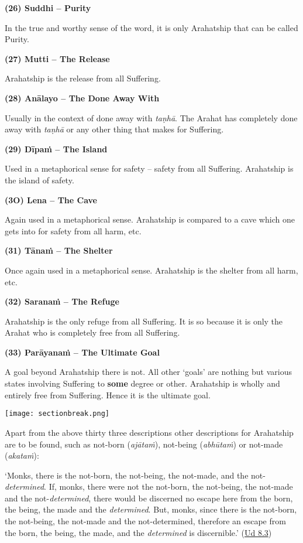 \textbf{(26) Suddhi -- Purity}

\protect\hypertarget{suddhi}{}{}In the true and worthy sense of the word, it is only Arahatship that can be called Purity.

\textbf{(27) Mutti -- The Release}

Arahatship is the release from all Suffering.

\textbf{(28) Anālayo -- The Done Away With}

Usually in the context of done away with \emph{taṇhā}. The Arahat has completely done away with \emph{taṇhā} or any other thing that makes for Suffering.

\textbf{(29) Dīpaṁ -- The Island}

Used in a metaphorical sense for safety -- safety from all Suffering. Arahatship is the island of safety.

\textbf{(3O) Lena -- The Cave}

Again used in a metaphorical sense. Arahatship is compared to a cave which one gets into for safety from all harm, etc.

\textbf{(31) Tānaṁ -- The Shelter}

Once again used in a metaphorical sense. Arahatship is the shelter from all harm, etc.

\textbf{(32) Saranaṁ -- The Refuge}

Arahatship is the only refuge from all Suffering. It is so because it is only the Arahat who is completely free from all Suffering.

\textbf{(33) Parāyanaṁ -- The Ultimate Goal}

A goal beyond Arahatship there is not. All other `goals' are nothing but various states involving Suffering to \textbf{some} degree or other. Arahatship is wholly and entirely free from Suffering. Hence it is the ultimate goal.

\texttt{[image: sectionbreak.png]}

Apart from the above thirty three descriptions other descriptions for Arahatship are to be found, such as not-born (\emph{ajātaṁ}), not-being (\emph{abhūtaṁ}) or not-made (\emph{akataṁ}):

`Monks, there is the not-born, the not-being, the not-made, and the not-\emph{determined}. If, monks, there were not the not-born, the not-being, the not-made and the not-\emph{determined}, there would be discerned no escape here from the born, the being, the made and the \emph{determined}. But, monks, since there is the not-born, the not-being, the not-made and the not-determined, therefore an escape from the born, the being, the made, and the \emph{determined} is discernible.' (\href{https://suttacentral.net/ud8.3/en/anandajoti}{Ud 8.3})

